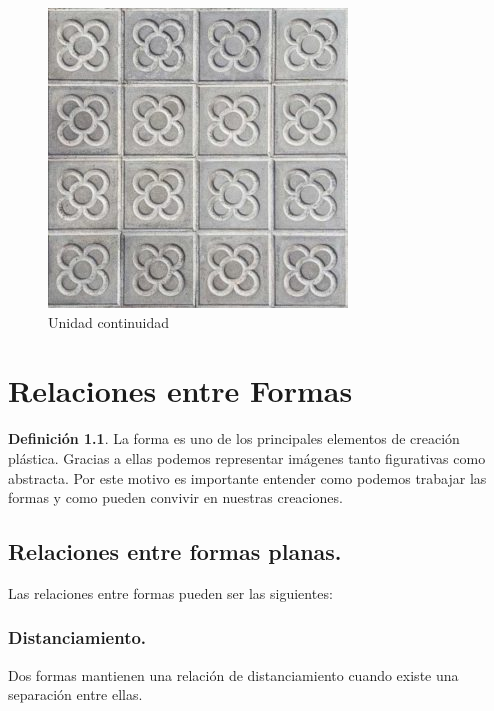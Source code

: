 \documentclass[
  16pt,
]{krantz}
\theoremstyle{definition}
\newtheorem{definition}{Definición}[chapter]
\theoremstyle{definition}
\theoremstyle{definition}
\theoremstyle{definition}
\theoremstyle{remark}
\begin{document}
\begin{figure}

{\centering \includegraphics[width=0.5\linewidth,height=1\textheight]{unidad3} 

}

\caption{Unidad continuidad}\label{fig:unidad3}
\end{figure}

\hypertarget{relaciones-entre-formas}{%
\chapter{Relaciones entre Formas}\label{relaciones-entre-formas}}

\begin{definition}
La forma es uno de los principales elementos de creación plástica. Gracias a ellas podemos representar imágenes tanto figurativas como abstracta. Por este motivo es importante entender como podemos trabajar las formas y como pueden convivir en nuestras creaciones.
\end{definition}

\hypertarget{relaciones-entre-formas-planas.}{%
\section{Relaciones entre formas planas.}\label{relaciones-entre-formas-planas.}}

Las relaciones entre formas pueden ser las siguientes:

\hypertarget{distanciamiento.}{%
\subsection{Distanciamiento.}\label{distanciamiento.}}

Dos formas mantienen una relación de distanciamiento cuando existe una separación entre ellas.
\end{document}
